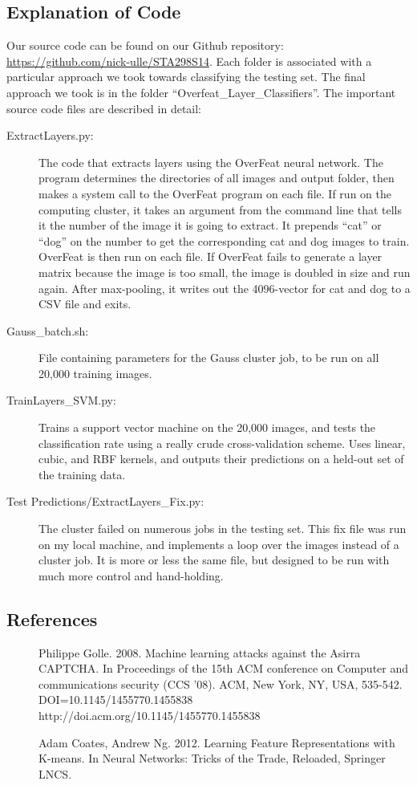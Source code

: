 \documentclass[12pt]{article}
\begin{document}
\subsection*{Explanation of Code}
Our source code can be found on our Github repository: \url{https://github.com/nick-ulle/STA298S14}. Each folder is associated with a particular approach we took towards classifying the testing set. The final approach we took is in the folder ``Overfeat\_Layer\_Classifiers''. The important source code files are described in detail:
\begin{description}
\item[ExtractLayers.py:] The code that extracts layers using the OverFeat neural network. The program determines the directories of all images and output folder, then makes a system call to the OverFeat program on each file. If run on the computing cluster, it takes an argument from the command line that tells it the number of the image it is going to extract. It prepends ``cat'' or ``dog'' on the number to get the corresponding cat and dog images to train. OverFeat is then run on each file. If OverFeat fails to generate a layer matrix because the image is too small, the image is doubled in size and run again. After max-pooling, it writes out the 4096-vector for cat and dog to a CSV file and exits.
\item[Gauss\_batch.sh:] File containing parameters for the Gauss cluster job, to be run on all 20,000 training images.
\item[TrainLayers\_SVM.py:] Trains a support vector machine on the 20,000 images, and tests the classification rate using a really crude cross-validation scheme. Uses linear, cubic, and RBF kernels, and outputs their predictions on a held-out set of the training data.
\item[Test Predictions/ExtractLayers\_Fix.py:] The cluster failed on numerous jobs in the testing set. This fix file was run on my local machine, and implements a loop over the images instead of a cluster job. It is more or less the same file, but designed to be run with much more control and hand-holding.
\end{description}

\subsection{References}
\begin{description}
\item[] Philippe Golle. 2008. Machine learning attacks against the Asirra CAPTCHA. In Proceedings of the 15th ACM conference on Computer and communications security (CCS '08). ACM, New York, NY, USA, 535-542. DOI=10.1145/1455770.1455838 http://doi.acm.org/10.1145/1455770.1455838
\item[] Adam Coates, Andrew Ng. 2012. Learning Feature Representations with K-means. In Neural Networks: Tricks of the Trade, Reloaded, Springer LNCS.
\end{description} 
\end{document}
